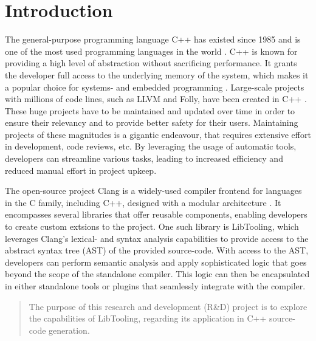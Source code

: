 \chapter{Introduction}

The general-purpose programming language C++ has existed since 1985 and is one of the most used programming languages in the world \cite{nexttechnologyprofessionalsMostPopularProgramming2022}.
C++ is known for providing a high level of abstraction without sacrificing performance.
It grants the developer full access to the underlying memory of the system, which makes it a popular choice for systems- and embedded programming  \cite{adminWhereUsedIndustry2021}.
Large-scale projects with millions of code lines, such as LLVM and Folly, have been created in C++ \cite{llvmLLVMCompilerInfrastructure, facebookFollyFacebookOpensource2023}.
These huge projects have to be maintained and updated over time in order to ensure their relevancy and to provide better safety for their users.
Maintaining projects of these magnitudes is a gigantic endeavour, that requires extensive effort in development, code reviews, etc.
By leveraging the usage of automatic tools, developers can streamline various tasks, leading to increased efficiency and reduced manual effort in project upkeep.

The open-source project Clang is a widely-used compiler frontend for languages in the C family, including C++, designed with a modular architecture \cite{clangClangLanguageFamily}.
It encompasses several libraries that offer reusable components, enabling developers to create custom extsions to the project.
One such library is LibTooling, which leverages Clang's lexical- and syntax analysis capabilities to provide access to the abstract syntax tree (AST) of the provided source-code.
With access to the AST, developers can perform semantic analysis and apply sophisticated logic that goes beyond the scope of the standalone compiler.
This logic can then be encapsulated in either standalone tools or plugins that seamlessly integrate with the compiler.

\begin{quote}
    The purpose of this research and development (R\&D) project is to explore the capabilities of LibTooling, regarding its application in C++ source-code generation.
\end{quote}


